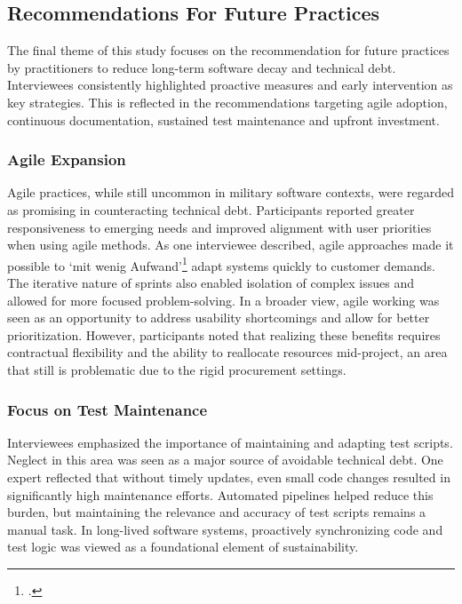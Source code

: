 \subsection{Recommendations For Future Practices}
The final theme of this study focuses on the recommendation for future practices by practitioners to reduce long-term software decay and technical debt. Interviewees consistently highlighted proactive measures and early intervention as key strategies. This is reflected in the recommendations targeting agile adoption, continuous documentation, sustained test maintenance and upfront investment.

\subsubsection{Agile Expansion}
Agile practices, while still uncommon in military software contexts, were regarded as promising in counteracting technical debt. Participants reported greater responsiveness to emerging needs and improved alignment with user priorities when using agile methods.
As one interviewee described, agile approaches made it possible to `mit wenig Aufwand'\footcite{Interview32025} adapt systems quickly to customer demands. The iterative nature of sprints also enabled isolation of complex issues and allowed for more focused problem-solving.
In a broader view, agile working was seen as an opportunity to address usability shortcomings and allow for better prioritization. However, participants noted that realizing these benefits requires contractual flexibility and the ability to reallocate resources mid-project, an area that still is problematic due to the rigid procurement settings.\\

\subsubsection{Focus on Test Maintenance}
Interviewees emphasized the importance of maintaining and adapting test scripts. Neglect in this area was seen as a major source of avoidable technical debt. One expert reflected that without timely updates, even small code changes resulted in significantly high maintenance efforts.
Automated pipelines helped reduce this burden, but maintaining the relevance and accuracy of test scripts remains a manual task. In long-lived software systems, proactively synchronizing code and test logic was viewed as a foundational element of sustainability.\\

